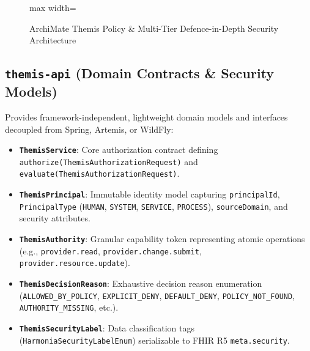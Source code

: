 \begin{figure}[htbp]
    \centering
    \begin{adjustbox}{max width=\textwidth}
        
    \end{adjustbox}
    \caption{ArchiMate Themis Policy \& Multi-Tier Defence-in-Depth Security Architecture}
    \label{fig:themis_security}
\end{figure}

\subsection{\texttt{themis-api} (Domain Contracts \& Security Models)}
Provides framework-independent, lightweight domain models and interfaces decoupled from Spring, Artemis, or WildFly:
\begin{itemize}
    \item \textbf{\texttt{ThemisService}}: Core authorization contract defining \texttt{authorize(ThemisAuthorizationRequest)} and \texttt{evaluate(ThemisAuthorizationRequest)}.
    \item \textbf{\texttt{ThemisPrincipal}}: Immutable identity model capturing \texttt{principalId}, \texttt{PrincipalType} (\texttt{HUMAN}, \texttt{SYSTEM}, \texttt{SERVICE}, \texttt{PROCESS}), \texttt{sourceDomain}, and security attributes.
    \item \textbf{\texttt{ThemisAuthority}}: Granular capability token representing atomic operations (e.g., \texttt{provider.read}, \texttt{provider.change.submit}, \texttt{provider.resource.update}).
    \item \textbf{\texttt{ThemisDecisionReason}}: Exhaustive decision reason enumeration (\texttt{ALLOWED\_BY\_POLICY}, \texttt{EXPLICIT\_DENY}, \texttt{DEFAULT\_DENY}, \texttt{POLICY\_NOT\_FOUND}, \texttt{AUTHORITY\_MISSING}, etc.).
    \item \textbf{\texttt{ThemisSecurityLabel}}: Data classification tags (\texttt{HarmoniaSecurityLabelEnum}) serializable to FHIR R5 \texttt{meta.security}.
\end{itemize}

